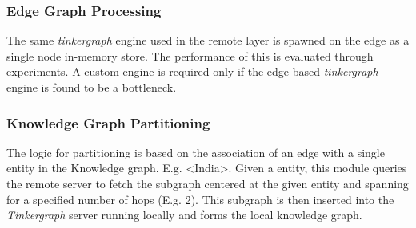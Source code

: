 \documentclass[conference]{IEEEtran}
\begin{document}
\subsubsection{Edge Graph Processing}
The same \emph{tinkergraph} engine used in the remote layer is spawned on the edge as a single node in-memory store. The performance of this is evaluated through experiments. A custom engine is required only if the edge based \emph{tinkergraph} engine is found to be a bottleneck.

\subsubsection{Knowledge Graph Partitioning}
The logic for partitioning is based on the association of an edge with a single entity in the Knowledge graph. E.g. <India>. Given a entity, this module queries the remote server to fetch the subgraph centered at the given entity and spanning for a specified number of hops (E.g. 2). This subgraph is then inserted into the \emph{Tinkergraph} server running locally and forms the local knowledge graph.
\end{document}

